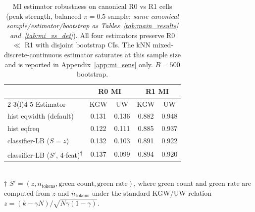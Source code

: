 \begin{table}[t]
\centering
\small
\caption{MI estimator robustness on canonical R0 vs R1 cells (peak strength,
balanced $\pi{=}0.5$ sample; \emph{same canonical sample/estimator/bootstrap
as Tables~\ref{tab:main_results} and~\ref{tab:mi_vs_det}}). All four estimators
preserve R0 $\ll$ R1 with disjoint bootstrap CIs. The kNN
mixed-discrete-continuous estimator saturates at this sample size and is
reported in Appendix~\ref{app:mi_sens} only. $B{=}500$ bootstrap.}
\label{tab:mi_robust}
\setlength{\tabcolsep}{4pt}
\begin{tabular}{l c c c c}
\toprule
& \multicolumn{2}{c}{R0 MI} & \multicolumn{2}{c}{R1 MI} \\
\cmidrule(r){2-3}\cmidrule(l){4-5}
Estimator & KGW & UW & KGW & UW \\
\midrule
hist eqwidth (default)                                & 0.131 & 0.136 & 0.882 & 0.948 \\
hist eqfreq                                            & 0.122 & 0.111 & 0.885 & 0.937 \\
classifier-LB ($S{=}z$)                                & 0.132 & 0.103 & 0.891 & 0.922 \\
classifier-LB ($S'$, 4-feat)\textsuperscript{$\dagger$} & 0.137 & 0.099 & 0.894 & 0.920 \\
\bottomrule
\end{tabular}\\
\smallskip
{\footnotesize $\dagger$ $S' = (z, n_\text{tokens}, \text{green count}, \text{green rate})$,
where green count and green rate are computed from $z$ and $n_\text{tokens}$
under the standard KGW/UW relation $z=(k-\gamma N)/\sqrt{N\gamma(1-\gamma)}$.}
\end{table}
